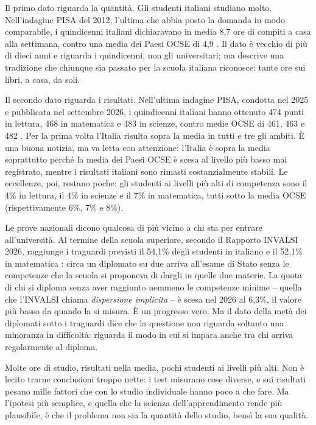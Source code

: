 Il primo dato riguarda la quantità. Gli studenti italiani studiano
molto. Nell'indagine PISA del 2012, l'ultima che abbia posto la domanda
in modo comparabile, i quindicenni italiani dichiaravano in media 8,7
ore di compiti a casa alla settimana, contro una media dei Paesi OCSE di
4,9 \parencite{oecd2014homework}. Il dato è vecchio di più di dieci anni
e riguarda i quindicenni, non gli universitari; ma descrive una
tradizione che chiunque sia passato per la scuola italiana riconosce:
tante ore sui libri, a casa, da soli.

Il secondo dato riguarda i risultati. Nell'ultima indagine PISA,
condotta nel 2025 e pubblicata nel settembre 2026, i quindicenni
italiani hanno ottenuto 474 punti in lettura, 468 in matematica e 483 in
scienze, contro medie OCSE di 461, 463 e 482 \parencite{oecd2026pisa}.
Per la prima volta l'Italia risulta sopra la media in tutti e tre gli
ambiti. È una buona notizia, ma va letta con attenzione: l'Italia è
sopra la media soprattutto perché la media dei Paesi OCSE è scesa al
livello più basso mai registrato, mentre i risultati italiani sono
rimasti sostanzialmente stabili. Le eccellenze, poi, restano poche: gli
studenti ai livelli più alti di competenza sono il 4\% in lettura, il
4\% in scienze e il 7\% in matematica, tutti sotto la media OCSE
(rispettivamente 6\%, 7\% e 8\%).

Le prove nazionali dicono qualcosa di più vicino a chi sta per entrare
all'università. Al termine della scuola superiore, secondo il Rapporto
INVALSI 2026, raggiunge i traguardi previsti il 54,1\% degli studenti
in italiano e il 52,1\% in matematica \parencite{invalsi2026}: circa un
diplomato su due arriva all'esame di Stato senza le competenze che la
scuola si proponeva di dargli in quelle due materie. La quota di chi
si diploma senza aver raggiunto nemmeno le competenze minime -- quella
che l'INVALSI chiama \emph{dispersione implicita} -- è scesa nel 2026
al 6,3\%, il valore più basso da quando la si misura. È un progresso
vero. Ma il dato della metà dei diplomati sotto i traguardi dice che la
questione non riguarda soltanto una minoranza in difficoltà: riguarda il
modo in cui si impara anche tra chi arriva regolarmente al diploma.

Molte ore di studio, risultati nella media, pochi studenti ai livelli
più alti. Non è lecito trarne conclusioni troppo nette: i test misurano
cose diverse, e sui risultati pesano mille fattori che con lo studio
individuale hanno poco a che fare. Ma l'ipotesi più semplice, e quella
che la scienza dell'apprendimento rende più plausibile, è che il
problema non sia la quantità dello studio, bensì la sua qualità.

